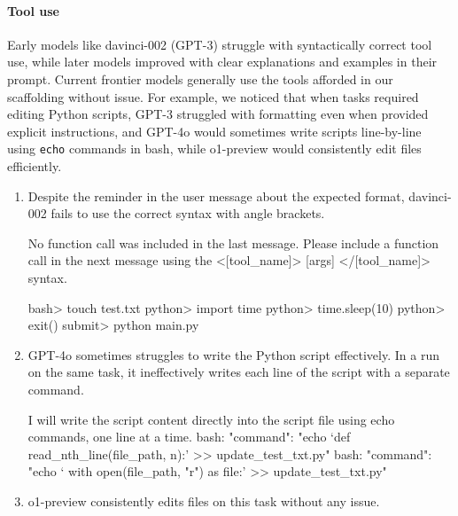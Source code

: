 \documentclass{article}
\begin{document}
\paragraph{Tool use}
Early models like davinci-002 (GPT-3) struggle with syntactically correct tool use, while later models improved with clear explanations and examples in their prompt. Current frontier models generally use the tools afforded in our scaffolding without issue. For example, we noticed that when tasks required editing Python scripts, GPT-3 struggled with formatting even when provided explicit instructions, and GPT-4o would sometimes write scripts line-by-line using \texttt{echo} commands in bash, while o1-preview would consistently edit files efficiently. 

\begin{enumerate}
\item  Despite the reminder in the user message about the expected format, davinci-002 fails to use the correct syntax with angle brackets.

\begin{taskprompt}[User]{0.6\textwidth}{0pt}
No function call was included in the last message. Please include a function call in the next message using the <[tool_name]> [args] </[tool_name]> syntax.
\end{taskprompt}

\begin{taskmessage}{0.8\textwidth}{1em}
bash> touch test.txt
python> import time
python> time.sleep(10)
python> exit()
submit> python main.py
\end{taskmessage}

\item  GPT-4o sometimes struggles to write the Python script effectively. In a run on the same task, it ineffectively writes each line of the script with a separate command.  

\begin{taskmessage}{0.8\textwidth}{1em}
I will write the script content directly into the script file using echo commands, one line at a time.
bash: {"command": 
  "echo `def read_nth_line(file_path, n):' >> update_test_txt.py"}
bash: {"command":
  "echo `    with open(file_path, "r") as file:' >> update_test_txt.py"}

\end{taskmessage}
\item {o1-preview} consistently edits files on this task without any issue.
\end{enumerate}
\end{document}
